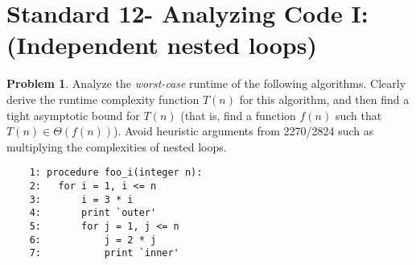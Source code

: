 \documentclass[11pt]{article}
\theoremstyle{definition}
\theoremstyle{definition}
\newtheorem{required}{Problem}
\theoremstyle{definition}
\begin{document}
\section{Standard 12- Analyzing Code I: (Independent nested loops)}
\begin{required}


Analyze the \textit{worst-case} runtime of the following algorithms. Clearly derive the runtime complexity function $T(n)$ for this algorithm, and then find a tight asymptotic bound for $T(n)$ (that is, find a function $f(n)$ such that $T(n) \in \Theta(f(n))$). Avoid heuristic arguments from 2270/2824 such as multiplying the complexities of nested loops.

\begin{verbatim}
	1: procedure foo_i(integer n):
	2:   for i = 1, i <= n
	3:       i = 3 * i
	4:       print `outer'
	5:       for j = 1, j <= n 
	6:           j = 2 * j
	7:           print `inner'
\end{verbatim}



\end{required}
\end{document}
